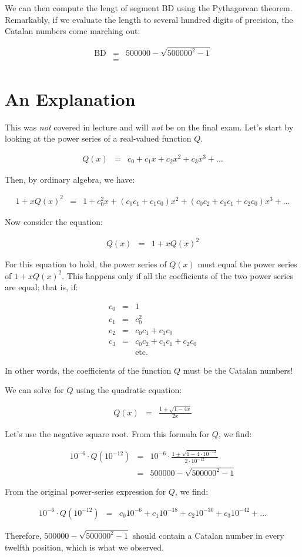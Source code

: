 \documentclass[twoside,12pt]{article}
\newcommand{\beqn}{\begin{eqnarray*}}
\newcommand{\eeqn}{\end{eqnarray*}}
\begin{document}
\bigskip
\centerline{}
\bigskip

\noindent We can then compute the lengt of segment BD using the
Pythagorean theorem.  Remarkably, if we evaluate the length to several
hundred digits of precision, the Catalan numbers come marching out:

\beqn
\text{BD}
	& = &	500000 - \sqrt{500000^2 - 1} \\
	& = &	
\eeqn

\section{An Explanation}

This was {\em not} covered in lecture and will {\em not} be on the
final exam.  Let's start by looking at the power series of a
real-valued function $Q$.

\beqn
Q(x) & = & c_0 + c_1 x + c_2 x^2 + c_3 x^3 + \ldots
\eeqn

\noindent Then, by ordinary algebra, we have:

\beqn
1 + xQ(x)^2 & = &
	1 +
	c_0^2 x +
	(c_0 c_1 + c_1 c_0) x^2 +
	(c_0 c_2 + c_1 c_1 + c_2 c_0) x^3 + \ldots
\eeqn

\noindent Now consider the equation:

\beqn
Q(x) & = & 1 + x Q(x)^2
\eeqn

\noindent For this equation to hold, the power series of $Q(x)$ must
equal the power series of $1 + x Q(x)^2$.  This happens only if all
the coefficients of the two power series are equal; that is, if:

\beqn
c_0 & = & 1 \\
c_1 & = & c_0^2 \\
c_2 & = & c_0 c_1 + c_1 c_0 \\
c_3 & = & c_0 c_2 + c_1 c_1 + c_2 c_0 \\
    &   & \text{etc.}
\eeqn

\noindent In other words, the coefficients of the function $Q$ must be
the Catalan numbers!

We can solve for $Q$ using the quadratic equation:

\beqn
Q(x) & = & \frac{1 \pm \sqrt{1 - 4x}}{2x}
\eeqn

\noindent Let's use the negative square root.  From this formula for
$Q$, we find:

\beqn
10^{-6} \cdot Q(10^{-12})
	& = & 10^{-6} \cdot
		\frac{1 \pm \sqrt{1 - 4 \cdot 10^{-12}}}{2 \cdot 10^{-12}} \\
	& = & 500000 - \sqrt{500000^2 - 1}
\eeqn

From the original power-series expression for $Q$, we find:

\beqn
10^{-6} \cdot Q(10^{-12})
	& = & c_0 10^{-6} + c_1 10^{-18} + c_2 10^{-30} + c_3 10^{-42} + \ldots
\eeqn

\noindent Therefore, $500000 - \sqrt{500000^2 - 1}$ should contain a
Catalan number in every twelfth position, which is what we observed.
\end{document}
